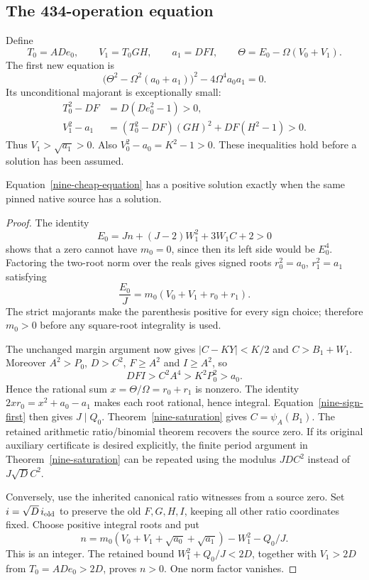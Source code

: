 \subsection{The 434-operation equation}

Define
\[
 T_0=ADe_0,\qquad V_1=T_0GH,\qquad a_1=DFI,\qquad
 \Theta=E_0-\Omega(V_0+V_1).
\]
The first new equation is
\begin{equation}
 \boxed{\bigl(\Theta^2-\Omega^2(a_0+a_1)\bigr)^2
                    -4\Omega^4a_0a_1=0.}
 \label{nine-cheap-equation}
\end{equation}
Its unconditional majorant is exceptionally small:
\begin{align}
 T_0^2-DF&=D(De_0^2-1)>0,\label{nine-cheap-defect}\\
 V_1^2-a_1&=(T_0^2-DF)(GH)^2+DF(H^2-1)>0.\nonumber
\end{align}
Thus $V_1>\sqrt{a_1}>0$.  Also $V_0^2-a_0=K^2-1>0$.
These inequalities hold before a solution has been assumed.

\begin{proposition}
\label{nine-cheap-equivalence}
Equation~\eqref{nine-cheap-equation} has a positive solution exactly when
the same pinned native source has a solution.
\end{proposition}

\begin{proof}
The identity
\[
 E_0=Jn+(J-2)W_1^2+3W_1C+2>0
\]
shows that a zero cannot have $m_0=0$, since then its left side would be
$E_0^4$.  Factoring the two-root norm over the reals gives signed roots
$r_0^2=a_0$, $r_1^2=a_1$ satisfying
\begin{equation}
 \frac{E_0}{J}=m_0(V_0+V_1+r_0+r_1).
 \label{nine-sign-first}
\end{equation}
The strict majorants make the parenthesis positive for every sign choice;
therefore $m_0>0$ before any square-root integrality is used.

The unchanged margin argument now gives $|C-KY|<K/2$ and
$C>B_1+W_1$.  Moreover $A^2>P_0$, $D>C^2$, $F\ge A^2$ and $I\ge A^2$,
so
\[
 DFI>C^2A^4>K^2P_0^2>a_0.
\]
Hence the rational sum $x=\Theta/\Omega=r_0+r_1$ is nonzero.  The identity
$2xr_0=x^2+a_0-a_1$ makes each root rational, hence integral.
Equation~\eqref{nine-sign-first} then gives $J\mid Q_0$.
Theorem~\ref{nine-saturation} gives $C=\psi_A(B_1)$.
The retained arithmetic ratio/binomial theorem recovers the source zero.
If its original auxiliary certificate is desired explicitly, the finite
period argument in Theorem~\ref{nine-saturation} can be repeated using
the modulus $JDC^2$ instead of $J\sqrt D C^2$.

Conversely, use the inherited canonical ratio witnesses from a source zero.
Set $i=\sqrt D\,i_{\rm old}$ to preserve the old $F,G,H,I$, keeping all
other ratio coordinates fixed.  Choose positive integral roots and put
\[
 n=m_0(V_0+V_1+\sqrt{a_0}+\sqrt{a_1})-W_1^2-Q_0/J.
\]
This is an integer.  The retained bound $W_1^2+Q_0/J<2D$, together with
$V_1>2D$ from $T_0=ADe_0>2D$, proves $n>0$.  One norm factor vanishes.
\end{proof}

